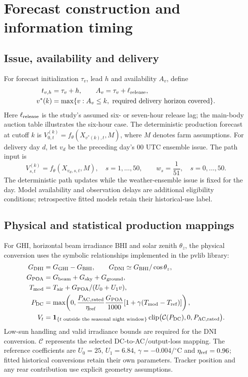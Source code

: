 \documentclass[11pt,a4paper]{article}
\DeclareMathOperator{\clip}{clip}
\begin{document}
\section{Forecast construction and information timing}
\subsection{Issue, availability and delivery}
For forecast initialization $\tau_v$, lead $h$ and availability $A_v$, define
\begin{align}
 t_{v,h}&=\tau_v+h,\qquad A_v=\tau_v+\ell_{\rm release},\\
 v^*(k)&=\max\{v:A_v\le k,\ \text{required delivery horizon covered}\}.
\end{align}
Here $\ell_{\rm release}$ is the study's assumed six- or seven-hour release
lag; the main-body auction table illustrates the six-hour case.
The deterministic production forecast at cutoff $k$ is
$V_{0,t}^{(k)}=f_{\theta}(X_{v^*(k),t},M)$, where $M$ denotes farm assumptions.
For delivery day $d$, let $v_d$ be the preceding day's 00 UTC ensemble issue.
The path input is
\begin{equation}
 V_{s,t}^{(k)}=f_\theta(X_{v_d,s,t},M),\quad s=1,\ldots,50,
 \qquad w_s=\frac1{51},\quad s=0,\ldots,50.
\end{equation}
The deterministic path updates while the weather-ensemble issue is fixed for
the day. Model availability and observation delays are additional eligibility
conditions; retrospective fitted models retain their historical-use label.

\subsection{Physical and statistical production mappings}
For GHI, horizontal beam irradiance BHI and solar zenith $\theta_z$, the
physical conversion uses the symbolic relationships implemented in the pvlib library:
\begin{align}
 G_{\rm DHI}&=G_{\rm GHI}-G_{\rm BHI},\qquad
 G_{\rm DNI}\simeq G_{\rm BHI}/\cos\theta_z,\\
 G_{\rm POA}&=G_{\rm beam}+G_{\rm sky}+G_{\rm ground},\\
 T_{\rm mod}&=T_{\rm air}+G_{\rm POA}/(U_0+U_1v),\\
 P_{\rm DC}&=\max\!\left(0,\frac{P_{\rm AC,rated}}{\eta_{\rm ref}}
   \frac{G_{\rm POA}}{1000}[1+\gamma(T_{\rm mod}-T_{\rm ref})]\right),\\
 V_t&=\mathbf1_{\{t\text{ outside the seasonal night window}\}}
       \clip\bigl(\mathcal C(P_{\rm DC}),0,P_{\rm AC,rated}\bigr).
\end{align}
Low-sun handling and valid irradiance bounds are required for the DNI
conversion. $\mathcal C$ represents the selected DC-to-AC/output-loss mapping.
The reference coefficients are $U_0=25$, $U_1=6.84$,
$\gamma=-0.004/{}^\circ\mathrm C$ and $\eta_{\rm ref}=0.96$; fitted historical
conversions retain their own parameters. Tracker position and any rear
contribution use explicit geometry assumptions.
\end{document}
